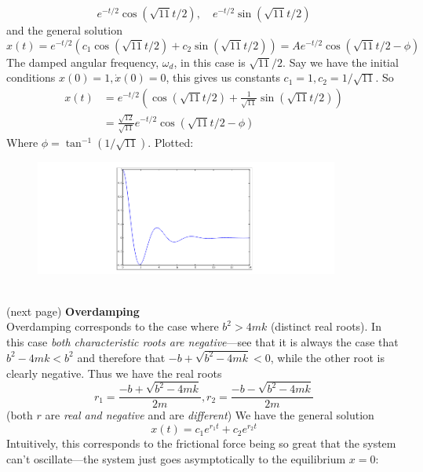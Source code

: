 \documentclass{report}
\begin{document}
\begin{equation*}
e^{-t/2}\cos(\sqrt{11}t/2),\quad e^{-t/2}\sin(\sqrt{11}t/2)
\end{equation*}
and the general solution
\begin{equation*}
x(t)=e^{-t/2}(c_1\cos(\sqrt{11}t/2)+c_2\sin(\sqrt{11}t/2))
=Ae^{-t/2}\cos(\sqrt{11}t/2-\phi)
\end{equation*}
The damped angular frequency, $\omega_d$, in this case is $\sqrt{11}/2$. Say we have the initial conditions 
$x(0)=1,\dot{x}(0)=0$, this gives us constants $c_1=1,c_2=1/\sqrt{11}$. So
\begin{align*}
x(t)&=e^{-t/2}\left(\cos(\sqrt{11}t/2)+\frac{1}{\sqrt{11}}\sin(\sqrt{11}t/2)\right)\\
&=\frac{\sqrt{12}}{\sqrt{11}}e^{-t/2}\cos(\sqrt{11}t/2-\phi)
\end{align*}
Where $\phi=\tan^{-1}(1/\sqrt{11})$. Plotted:
\begin{figure}[h]
\begin{center}
\includegraphics[width=10cm]{26}\\
\end{center}
\end{figure}\\
(next page)
\newpage
\noindent\textbf{Overdamping}\\
Overdamping corresponds to the case where $b^2>4mk$ (distinct real roots). In this case \textit{both characteristic roots are negative}---see that it is always the case that
$b^2-4mk<b^2$ and therefore that $-b+\sqrt{b^2-4mk}<0$, while the other root is clearly negative. Thus we have
the real roots
\begin{equation*}
r_1=\frac{-b+\sqrt{b^2-4mk}}{2m},r_2=\frac{-b-\sqrt{b^2-4mk}}{2m}
\end{equation*}
(both $r$ are \textit{real and negative} and are \textit{different}) We have the general solution
\begin{equation*}
x(t)=c_1e^{r_1t}+c_2e^{r_2t}
\end{equation*}
Intuitively, this corresponds to the frictional force being so great that the system can't oscillate---the system
just goes asymptotically to the equilibrium $x=0$:
\end{document}
